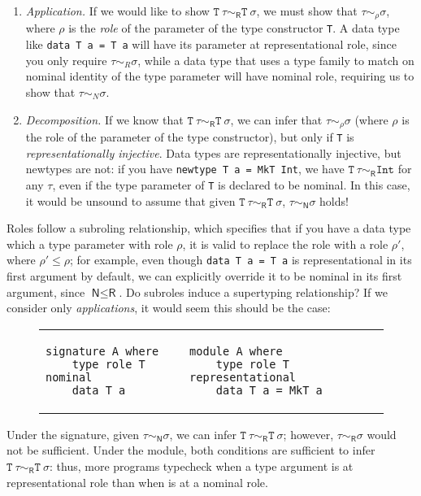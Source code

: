 \begin{enumerate}
    \item \emph{Application.} If we would like to show $\texttt{T}~\tau \sim_\textsf{R}
    \texttt{T}~\sigma$, we must show that $\tau \sim_\rho \sigma$, where
    $\rho$ is the \emph{role} of the parameter of the type constructor
    \verb|T|.  A data type like \verb|data T a = T a| will have its parameter
    at representational role, since you only require $\tau \sim_R
    \sigma$, while a data type that uses a type family to match on
    nominal identity of the type parameter will have nominal role,
    requiring us to show that $\tau \sim_N \sigma$.

    \item \emph{Decomposition.}  If we know that $\texttt{T}~\tau \sim_\textsf{R}
    \texttt{T}~\sigma$, we can infer that $\tau \sim_\rho \sigma$ (where $\rho$
    is the role of the parameter of the type constructor),
    but only if \verb|T| is \emph{representationally injective}.  Data types
    are representationally injective, but newtypes are not: if you
    have \verb|newtype T a = MkT Int|,
    we have $\texttt{T}~\tau \sim_\textsf{R} \texttt{Int}$ for any $\tau$,
    even if the type parameter of \verb|T| is declared
    to be nominal.  In this case,
    it would be unsound to assume that given
    $\texttt{T}~\tau \sim_\textsf{R} \texttt{T}~\sigma$, $\tau \sim_\textsf{N} \sigma$ holds!
\end{enumerate}
%
Roles follow a subroling relationship, which specifies that if you have
a data type which a type parameter with role $\rho$, it is valid to
replace the role with a role $\rho'$, where $\rho' \le \rho$; for example,
even though \verb|data T a = T a| is representational in its first
argument by default, we can explicitly override it to be nominal in its
first argument, since $\textsf{N} \le \textsf{R}$.  Do subroles induce
a supertyping relationship?  If we consider only \emph{applications}, it would
seem this should be the case:

\vspace{-1em}
\begin{figure}[H]
\begin{tabular}{p{} p{}}
\begin{lstlisting}
signature A where
    type role T nominal
    data T a
\end{lstlisting}
&
\begin{lstlisting}
module A where
    type role T representational
    data T a = MkT a
\end{lstlisting}
\end{tabular}
\end{figure}
\vspace{-1em}
%
\noindent
Under the signature, given $\tau \sim_\textsf{N} \sigma$, we can infer
$\texttt{T}~\tau \sim_\textsf{R} \texttt{T}~\sigma$; however,
$\tau \sim_\textsf{R} \sigma$ would not be sufficient.
Under the module, both conditions are sufficient to infer
$\texttt{T}~\tau \sim_\textsf{R} \texttt{T}~\sigma$: thus,
more programs typecheck when a type argument is at representational role
than when is at a nominal role.

